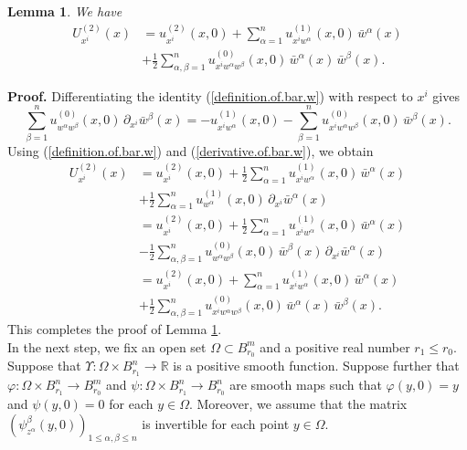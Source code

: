 \documentclass[11pt]{amsart}
\newtheorem{lemma}[theorem]{Lemma}
\theoremstyle{definition}
\begin{document}
\begin{lemma}
\label{derivative.of.U2}
We have 
\begin{align*}
U^{(2)}_{x^i}(x) 
&= u^{(2)}_{x^i}(x,0) + \sum_{\alpha=1}^n u^{(1)}_{x^i w^\alpha}(x,0) \, \bar{w}^\alpha(x) \\ 
&+ \frac{1}{2} \sum_{\alpha,\beta=1}^n u^{(0)}_{x^i w^\alpha w^\beta}(x,0) \, \bar{w}^\alpha(x) \, \bar{w}^\beta(x). 
\end{align*}
\end{lemma}

\textbf{Proof.}
Differentiating the identity (\ref{definition.of.bar.w}) with respect to $x^i$ gives 
\begin{equation} 
\label{derivative.of.bar.w}
\sum_{\beta=1}^n u^{(0)}_{w^\alpha w^\beta}(x,0) \, \partial_{x^i} \bar{w}^\beta(x) = -u^{(1)}_{x^i w^\alpha}(x,0) - \sum_{\beta=1}^n u^{(0)}_{x^i w^\alpha w^\beta}(x,0) \, \bar{w}^\beta(x). 
\end{equation}
Using (\ref{definition.of.bar.w}) and (\ref{derivative.of.bar.w}), we obtain 
\begin{align*}
U^{(2)}_{x^i}(x) 
&= u^{(2)}_{x^i}(x,0) + \frac{1}{2} \sum_{\alpha=1}^n u^{(1)}_{x^i w^\alpha}(x,0) \, \bar{w}^\alpha(x) \\ 
&+ \frac{1}{2} \sum_{\alpha=1}^n u^{(1)}_{w^\alpha}(x,0) \, \partial_{x^i} \bar{w}^\alpha(x) \\ 
&= u^{(2)}_{x^i}(x,0) + \frac{1}{2} \sum_{\alpha=1}^n u^{(1)}_{x^i w^\alpha}(x,0) \, \bar{w}^\alpha(x) \\ 
&- \frac{1}{2} \sum_{\alpha,\beta=1}^n u^{(0)}_{w^\alpha w^\beta}(x,0) \, \bar{w}^\beta(x) \, \partial_{x^i} \bar{w}^\alpha(x) \\ 
&= u^{(2)}_{x^i}(x,0) + \sum_{\alpha=1}^n u^{(1)}_{x^i w^\alpha}(x,0) \, \bar{w}^\alpha(x) \\ 
&+ \frac{1}{2} \sum_{\alpha,\beta=1}^n u^{(0)}_{x^i w^\alpha w^\beta}(x,0) \, \bar{w}^\alpha(x) \, \bar{w}^\beta(x). 
\end{align*}
This completes the proof of Lemma \ref{derivative.of.U2}. \\

In the next step, we fix an open set $\Omega \subset B_{r_0}^m$ and a positive real number $r_1 \leq r_0$. Suppose that $\Upsilon: \Omega \times B_{r_1}^n \to \mathbb{R}$ is a positive smooth function. Suppose further that $\varphi: \Omega \times B_{r_1}^n \to B_{r_0}^m$ and $\psi: \Omega \times B_{r_1}^n \to B_{r_0}^n$ are smooth maps such that $\varphi(y,0) = y$ and $\psi(y,0) = 0$ for each $y \in \Omega$. Moreover, we assume that the matrix $(\psi^\beta_{z^\alpha}(y,0))_{1 \leq \alpha,\beta \leq n}$ is invertible for each point $y \in \Omega$. 
\end{document}
